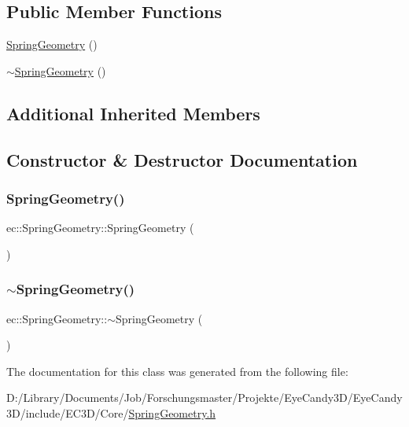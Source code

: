 \subsection*{Public Member Functions}
\begin{DoxyCompactItemize}
\item 
\mbox{\hyperlink{classec_1_1_spring_geometry_afc2aa4b3e49cc72083f9b3bc1b1d22be}{Spring\+Geometry}} ()
\item 
\mbox{\hyperlink{classec_1_1_spring_geometry_aaf7c2395d3d548c549eb76a10c85a60e}{$\sim$\+Spring\+Geometry}} ()
\end{DoxyCompactItemize}
\subsection*{Additional Inherited Members}


\subsection{Constructor \& Destructor Documentation}
\mbox{\label{classec_1_1_spring_geometry_afc2aa4b3e49cc72083f9b3bc1b1d22be}} 
\subsubsection{\texorpdfstring{Spring\+Geometry()}{SpringGeometry()}}
{\footnotesize\ttfamily ec\+::\+Spring\+Geometry\+::\+Spring\+Geometry (\begin{DoxyParamCaption}{ }\end{DoxyParamCaption})\hspace{0.3cm}{\ttfamily [explicit]}}

\mbox{\label{classec_1_1_spring_geometry_aaf7c2395d3d548c549eb76a10c85a60e}} 
\subsubsection{\texorpdfstring{$\sim$\+Spring\+Geometry()}{~SpringGeometry()}}
{\footnotesize\ttfamily ec\+::\+Spring\+Geometry\+::$\sim$\+Spring\+Geometry (\begin{DoxyParamCaption}{ }\end{DoxyParamCaption})}



The documentation for this class was generated from the following file\+:\begin{DoxyCompactItemize}
\item 
D\+:/\+Library/\+Documents/\+Job/\+Forschungsmaster/\+Projekte/\+Eye\+Candy3\+D/\+Eye\+Candy3\+D/include/\+E\+C3\+D/\+Core/\mbox{\hyperlink{_spring_geometry_8h}{Spring\+Geometry.\+h}}\end{DoxyCompactItemize}
